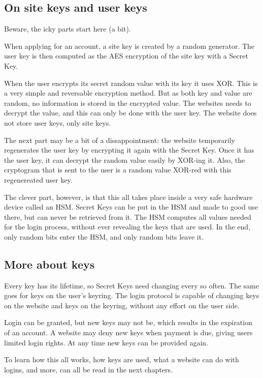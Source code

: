 \subsection{On site keys and user keys}
Beware, the icky parts start here (a bit).
\par
When applying for an account, a site key is created by a random generator.
The user key is then computed as the AES encryption of the site key with a Secret Key.
\par
When the user encrypts its secret random value with its key it uses XOR.
This is a very simple and reversable encryption method.
But as both key and value are random, no information is stored in the encrypted value.
The websites needs to decrypt the value, and this can only be done with the user key.
The website does not store user keys, only site keys.
\par
The next part may be a bit of a dissappointment:
the website temporarily regenerates the user key by encrypting it again with the Secret Key.
Once it has the user key, it can decrypt the random value easily by XOR-ing it.
Also, the cryptogram that is sent to the user is a random value XOR-red with this regenereated user key.
\par
The clever part, however, is that this all takes place inside a very safe hardware device called an HSM.
Secret Keys can be put in the HSM and made to good use there, but can never be retrieved from it.
The HSM computes all values needed for the login process,
without ever revealing the keys that are used.
In the end,
only random bits enter the HSM,
and only random bits leave it.
\subsection{More about keys}
Every key has its lifetime, so Secret Keys need changing every so often.
The same goes for keys on the user's keyring.
The login protocol is capable of changing keys on the website and keys on the keyring,
without any effort on the user side.
\par
Login can be granted,
but new keys may not be,
which results in the expiration of an account.
A website may deny new keys when payment is due,
giving users limited login rights.
At any time new keys can be provided again.
\par
\par
To learn how this all works,
how keys are used,
what a website can do with logins,
and more,
can all be read in the next chapters.
